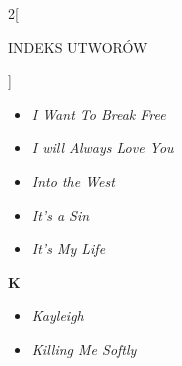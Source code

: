 \documentclass[a4paper]{report}
\begin{document}
\begin{multicols*}{2}[\begin{Huge}INDEKS UTWORÓW\end{Huge}\vspace{1cm}]
\begin{minipage}{\columnwidth}
\end{minipage}
\begin{minipage}{\columnwidth}
	\begin{itemize}[topsep=6pt, after=\vspace{1.5mm}, leftmargin=0mm]
		\itemsep0em
		\item[]  \textit{I Want To Break Free}  \\
	\end{itemize}
\end{minipage}
\begin{minipage}{\columnwidth}
	\begin{itemize}[topsep=6pt, after=\vspace{1.5mm}, leftmargin=0mm]
		\itemsep0em
		\item[]  \textit{I will Always Love You}  \\
	\end{itemize}
\end{minipage}
\begin{minipage}{\columnwidth}
	\begin{itemize}[topsep=6pt, after=\vspace{1.5mm}, leftmargin=0mm]
		\itemsep0em
		\item[]  \textit{Into the West}  \\
	\end{itemize}
\end{minipage}
\begin{minipage}{\columnwidth}
	\begin{itemize}[topsep=6pt, after=\vspace{5mm}, leftmargin=0mm]
		\itemsep0em
		\item[]  \textit{It's a Sin}  \\
		\item[]  \textit{It's My Life}  \\
	\end{itemize}
\end{minipage}
\begin{minipage}{\columnwidth}
\begin{Large}
		\textbf{K}
	\end{Large} 
	\begin{itemize}[topsep=6pt, after=\vspace{5mm}, leftmargin=0mm]
		\itemsep0em
		\item[]\textit{Kayleigh}  \\
		\item[]  \textit{Killing Me Softly}  \\

\end{itemize}
\end{minipage}
\end{multicols*}
\end{document}
